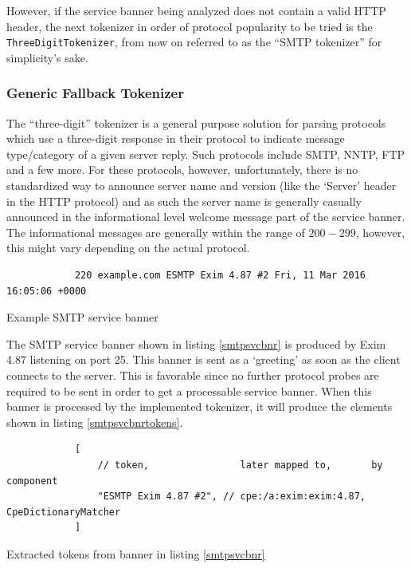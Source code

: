 \documentclass[a4paper,12pt]{article}
\begin{document}
	However, if the service banner being analyzed does not contain a valid HTTP header, the next tokenizer in order of protocol popularity to be tried is the \texttt{ThreeDigitTokenizer}, from now on referred to as the ``SMTP tokenizer'' for simplicity's sake.

\subsubsection{Generic Fallback Tokenizer}
 
	
	The ``three-digit'' tokenizer is a general purpose solution for parsing protocols which use a three-digit response in their protocol to indicate message type/category of a given server reply. Such protocols include SMTP, NNTP, FTP and a few more. For these protocols, however, unfortunately, there is no standardized way to announce server name and version (like the `Server' header in the HTTP protocol) and as such the server name is generally casually announced in the informational level welcome message part of the service banner. The informational messages are generally within the range of $200-299$, however, this might vary depending on the actual protocol.
	
	\begin{listing}[H]
		\begin{verbatim}
			220 example.com ESMTP Exim 4.87 #2 Fri, 11 Mar 2016 16:05:06 +0000
		\end{verbatim}
		\caption{Example SMTP service banner}
		\label{smtpsvcbnr}
	\end{listing}
		
	The SMTP service banner shown in listing \ref{smtpsvcbnr} is produced by Exim 4.87 listening on port 25. This banner is sent as a `greeting' as soon as the client connects to the server. This is favorable since no further protocol probes are required to be sent in order to get a processable service banner. When this banner is processed by the implemented tokenizer, it will produce the elements shown in listing \ref{smtpsvcbnrtokens}.
		
	\begin{listing}[H]
		\begin{verbatim}
			[
				// token,                later mapped to,       by component
				"ESMTP Exim 4.87 #2", // cpe:/a:exim:exim:4.87, CpeDictionaryMatcher
			]
		\end{verbatim}
		\caption{Extracted tokens from banner in listing \ref{smtpsvcbnr}}
		\label{smtpsvcbnrtokens}
	\end{listing}
	
\end{document}
